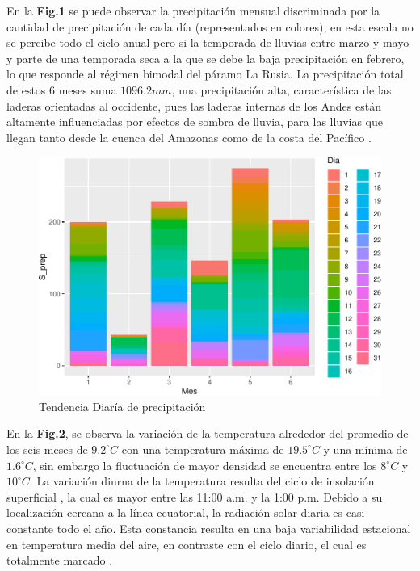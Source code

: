 \documentclass[conference,final,]{IEEEtran}
\makeatletter
\def\maxwidth{\ifdim\Gin@nat@width>\linewidth\linewidth
\else\Gin@nat@width\fi}
\let\Oldincludegraphics\includegraphics
\renewcommand{\includegraphics}[1]{\Oldincludegraphics[width=\maxwidth]{#1}}
\makeatother
\begin{document}
En la \textbf{Fig.1} se puede observar la precipitación mensual
discriminada por la cantidad de precipitación de cada día (representados
en colores), en esta escala no se percibe todo el ciclo anual pero si la
temporada de lluvias entre marzo y mayo y parte de una temporada seca a
la que se debe la baja precipitación en febrero, lo que responde al
régimen bimodal del páramo La Rusia. La precipitación total de estos 6
meses suma \(1096.2mm\), una precipitación alta, característica de las
laderas orientadas al occidente, pues las laderas internas de los Andes
están altamente influenciadas por efectos de sombra de lluvia, para las
lluvias que llegan tanto desde la cuenca del Amazonas como de la costa
del Pacífico \cite{buytaert2006hidrologia}.

\begin{figure}
\centering
\includegraphics{Hidrology_files/figure-latex/unnamed-chunk-1-1.pdf}
\caption{Tendencia Diaría de precipitación}
\end{figure}

En la \textbf{Fig.2}, se observa la variación de la temperatura
alrededor del promedio de los seis meses de \(9.2^{\circ}C\) con una
temperatura máxima de \(19.5^{\circ}C\) y una mínima de
\(1.6^{\circ}C\), sin embargo la fluctuación de mayor densidad se
encuentra entre los \(8^{\circ}C\) y \(10^{\circ}C\). La variación
diurna de la temperatura resulta del ciclo de insolación superficial
\cite{poveda2004hidroclimatologia}, la cual es mayor entre las 11:00
a.m. y la 1:00 p.m. Debido a su localización cercana a la línea
ecuatorial, la radiación solar diaria es casi constante todo el año.
Esta constancia resulta en una baja variabilidad estacional en
temperatura media del aire, en contraste con el ciclo diario, el cual es
totalmente marcado \cite{buytaert2006hidrologia}.
\end{document}
